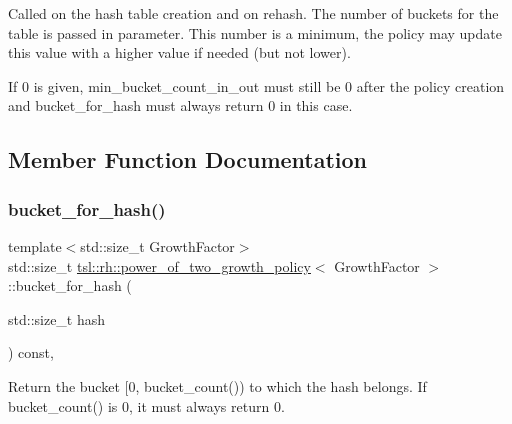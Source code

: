 Called on the hash table creation and on rehash. The number of buckets for the table is passed in parameter. This number is a minimum, the policy may update this value with a higher value if needed (but not lower).

If 0 is given, min\+\_\+bucket\+\_\+count\+\_\+in\+\_\+out must still be 0 after the policy creation and bucket\+\_\+for\+\_\+hash must always return 0 in this case. 

\subsection{Member Function Documentation}
\mbox{\label{classtsl_1_1rh_1_1power__of__two__growth__policy_ae9f7810f6786c7ead8f3da64b0d1a719}} 
\subsubsection{\texorpdfstring{bucket\_for\_hash()}{bucket\_for\_hash()}}
{\footnotesize\ttfamily template$<$std\+::size\+\_\+t Growth\+Factor$>$ \\
std\+::size\+\_\+t \mbox{\hyperlink{classtsl_1_1rh_1_1power__of__two__growth__policy}{tsl\+::rh\+::power\+\_\+of\+\_\+two\+\_\+growth\+\_\+policy}}$<$ Growth\+Factor $>$\+::bucket\+\_\+for\+\_\+hash (\begin{DoxyParamCaption}\item[{std\+::size\+\_\+t}]{hash }\end{DoxyParamCaption}) const\hspace{0.3cm}{\ttfamily [inline]}, {\ttfamily [noexcept]}}

Return the bucket \mbox{[}0, bucket\+\_\+count()) to which the hash belongs. If bucket\+\_\+count() is 0, it must always return 0. \mbox{\label{classtsl_1_1rh_1_1power__of__two__growth__policy_aff6441091ef925c6d669c69d9ccbcbbc}} 
